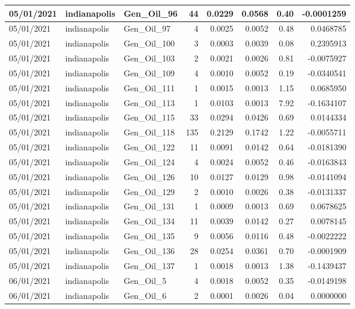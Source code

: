 \documentclass[
  letterpaper,
  DIV=11,
  numbers=noendperiod]{scrartcl}
\begin{document}
\begin{tabular}{l|l|l|r|r|r|r|r}
\hline
05/01/2021 & indianapolis & Gen\_Oil\_96 & 44 & 0.0229 & 0.0568 & 0.40 & -0.0001259\\
\hline
05/01/2021 & indianapolis & Gen\_Oil\_97 & 4 & 0.0025 & 0.0052 & 0.48 & 0.0468785\\
\hline
05/01/2021 & indianapolis & Gen\_Oil\_100 & 3 & 0.0003 & 0.0039 & 0.08 & 0.2395913\\
\hline
05/01/2021 & indianapolis & Gen\_Oil\_103 & 2 & 0.0021 & 0.0026 & 0.81 & -0.0075927\\
\hline
05/01/2021 & indianapolis & Gen\_Oil\_109 & 4 & 0.0010 & 0.0052 & 0.19 & -0.0340541\\
\hline
05/01/2021 & indianapolis & Gen\_Oil\_111 & 1 & 0.0015 & 0.0013 & 1.15 & 0.0685950\\
\hline
05/01/2021 & indianapolis & Gen\_Oil\_113 & 1 & 0.0103 & 0.0013 & 7.92 & -0.1634107\\
\hline
05/01/2021 & indianapolis & Gen\_Oil\_115 & 33 & 0.0294 & 0.0426 & 0.69 & 0.0144334\\
\hline
05/01/2021 & indianapolis & Gen\_Oil\_118 & 135 & 0.2129 & 0.1742 & 1.22 & -0.0055711\\
\hline
05/01/2021 & indianapolis & Gen\_Oil\_122 & 11 & 0.0091 & 0.0142 & 0.64 & -0.0181390\\
\hline
05/01/2021 & indianapolis & Gen\_Oil\_124 & 4 & 0.0024 & 0.0052 & 0.46 & -0.0163843\\
\hline
05/01/2021 & indianapolis & Gen\_Oil\_126 & 10 & 0.0127 & 0.0129 & 0.98 & -0.0141094\\
\hline
05/01/2021 & indianapolis & Gen\_Oil\_129 & 2 & 0.0010 & 0.0026 & 0.38 & -0.0131337\\
\hline
05/01/2021 & indianapolis & Gen\_Oil\_131 & 1 & 0.0009 & 0.0013 & 0.69 & 0.0678625\\
\hline
05/01/2021 & indianapolis & Gen\_Oil\_134 & 11 & 0.0039 & 0.0142 & 0.27 & 0.0078145\\
\hline
05/01/2021 & indianapolis & Gen\_Oil\_135 & 9 & 0.0056 & 0.0116 & 0.48 & -0.0022222\\
\hline
05/01/2021 & indianapolis & Gen\_Oil\_136 & 28 & 0.0254 & 0.0361 & 0.70 & -0.0001909\\
\hline
05/01/2021 & indianapolis & Gen\_Oil\_137 & 1 & 0.0018 & 0.0013 & 1.38 & -0.1439437\\
\hline
06/01/2021 & indianapolis & Gen\_Oil\_5 & 4 & 0.0018 & 0.0052 & 0.35 & -0.0149198\\
\hline
06/01/2021 & indianapolis & Gen\_Oil\_6 & 2 & 0.0001 & 0.0026 & 0.04 & 0.0000000\\

\end{tabular}
\end{document}
